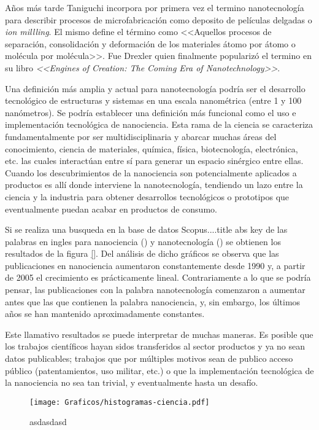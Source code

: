 	Años más tarde Taniguchi incorpora por primera vez el termino nanotecnología para describir procesos de microfabricación como deposito de películas delgadas o \textit{ion millling}. El mismo define el término como <<Aquellos procesos de separación, consolidación y deformación de los materiales átomo por átomo o molécula por molécula>>. \cite{taniguchi1974} Fue Drexler quien finalmente popularizó el termino en su libro \textit{<<Engines of Creation: The Coming Era of Nanotechnology>>}\cite{drexler1987}. 

	Una definición más amplia y actual para nanotecnología podría ser el desarrollo tecnológico de estructuras y sistemas en una escala nanométrica (entre 1 y 100 nanómetros). Se podría establecer una definición más funcional como el uso e implementación tecnológica de nanociencia. Esta rama de la ciencia se caracteriza fundamentalmente por ser multidisciplinaria y abarcar muchas áreas del conocimiento, ciencia de materiales, química, física, biotecnología, electrónica, etc. las cuales interactúan entre sí para generar un espacio sinérgico entre ellas. Cuando los descubrimientos de la nanociencia son potencialmente aplicados a productos es allí donde interviene la nanotecnología, tendiendo un lazo entre la ciencia y la industria para obtener desarrollos tecnológicos o prototipos que eventualmente puedan acabar en productos de consumo.

	Si se realiza una busqueda en la base de datos Scopus....title abs key  de las palabras en ingles para nanociencia () y nanotecnología () se obtienen los resultados de la figura \ref{}. Del análisis de dicho gráficos se observa que las publicaciones en nanociencia aumentaron constantemente desde 1990 y, a partir de 2005 el crecimiento es prácticamente lineal. Contrariamente a lo que se podría pensar, las publicaciones con la palabra nanotecnología comenzaron a aumentar antes que las que contienen la palabra nanociencia, y, sin embargo, los últimos años se han mantenido aproximadamente constantes. 

	Este llamativo resultados se puede interpretar de muchas maneras. Es posible que los trabajos científicos hayan sidos transferidos al sector productos y ya no sean datos publicables; trabajos que por múltiples motivos sean de publico acceso público (patentamientos, uso militar, etc.) o que la implementación tecnológica de la nanociencia no sea tan trivial, y eventualmente hasta un desafío. 

		\begin{center}
 			\begin{figure}
 			\texttt{[image: Graficos/histogramas-ciencia.pdf]}
 			\caption[asdasd]{asdasdasd}
 			\label{fig:dasd}
 		    \end{figure}
 		    \end{center}


